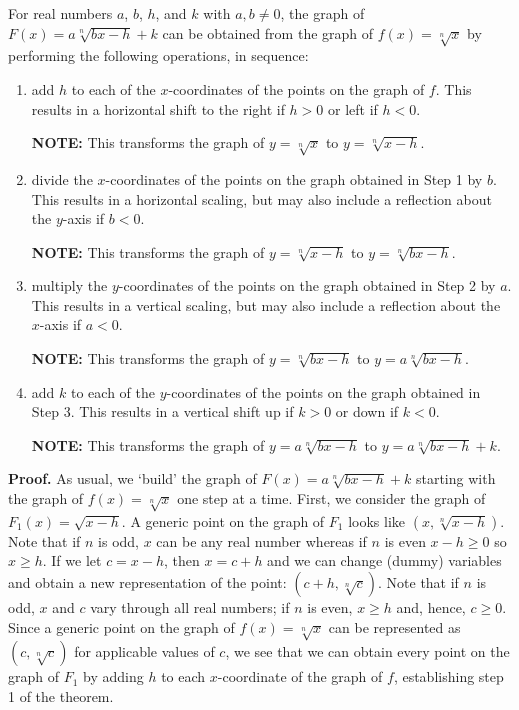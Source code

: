 \begin{ithm}
   \label{linearrootgraphs}  For real numbers $a$, $b$, $h$, and $k$ with $a, b \neq 0$, the graph of $F(x) = a\sqrt[n]{bx-h} +k$  can be obtained from the graph of $f(x) = \sqrt[n]{x}$ by performing the following operations, in sequence:

\begin{enumerate}

\item  add $h$ to each of the $x$-coordinates of the points on the graph of $f$.  This results in a horizontal shift to the right if $h > 0$ or left if $h < 0$.

\textbf{NOTE:}  This transforms the graph of $y = \sqrt[n]{x}$ to $y = \sqrt[n]{x-h}$.

\item  divide the $x$-coordinates of the points on the graph obtained in Step 1 by $b$.  This results in a horizontal scaling, but may also include a reflection about the $y$-axis if $b < 0$.

\textbf{NOTE:}  This transforms the graph of $y = \sqrt[n]{x-h}$ to $y = \sqrt[n]{bx-h}$.

\item  multiply the $y$-coordinates of the points on the graph obtained in Step 2 by $a$.   This results in a vertical scaling, but may also include a reflection about the $x$-axis if $a < 0$.

\textbf{NOTE:}  This transforms the graph of $y = \sqrt[n]{bx-h}$ to $y = a\sqrt[n]{bx-h}$.

\item  add $k$ to each of the $y$-coordinates of the points on the graph obtained in Step 3.  This results in a vertical shift up if $k > 0$ or down if $k< 0$.

\textbf{NOTE:}  This transforms the graph of $y = a\sqrt[n]{bx-h}$ to $y = a\sqrt[n]{bx-h} + k$.

\end{enumerate}

\end{ithm}

 {\bf Proof.}  As usual, we `build' the graph of $F(x) = a \sqrt[n]{bx-h}+k$ starting with the graph of $f(x) = \sqrt[n]{x}$ one step at a time.  First, we consider the graph of $F_{1}(x) = \sqrt{x-h}$.  A generic point on the graph of $F_{1}$ looks like $(x, \sqrt[n]{x-h})$.  Note that if $n$ is odd, $x$ can be any real number whereas if $n$ is even $x-h \geq 0$ so $x \geq h$.   If we let $c = x-h$, then $x = c+h$ and we can change (dummy) variables and obtain a new representation of the point: $(c+h, \sqrt[n]{c})$.  Note that if $n$ is odd, $x$ and $c$ vary through all real numbers;  if $n$ is even, $x \geq h$ and, hence,  $c \geq 0$.  Since a generic point on the graph of $f(x) = \sqrt[n]{x}$ can be represented as $(c, \sqrt[n]{c})$ for applicable values of $c$, we see that we can obtain every point on the graph of $F_{1}$ by adding $h$ to each $x$-coordinate of the graph of $f$, establishing step 1 of the theorem.  
 
